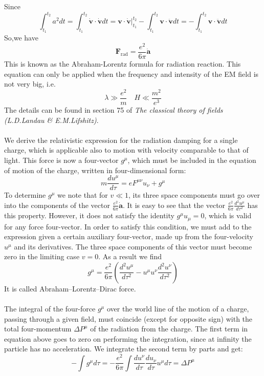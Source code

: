 Since
\[\int_{t_{1}}^{t_{2}}a^{2}dt = \int_{t_{1}}^{t_{2}}\dot{\bm{v}}\cdot\dot{\bm{v}}dt = \bm{v}\cdot\dot{\bm{v}}|_{t_{1}}^{t_{2}}-\int_{t_{1}}^{t_{2}}\bm{v} \cdot\ddot{\bm{v}}dt = -\int_{t_{1}}^{t_{2}}\bm{v} \cdot\ddot{\bm{v}}dt\]
So,we have
\[\bm{F}_{\mathrm{rad}} = \frac{e^2}{6\pi} \dot{\bm{a}}\]
This is known as the Abraham-Lorentz formula for radiation reaction. This equation can only be applied when the frequency and intensity of the EM field is not very big, i.e.
\[\lambda \gg \frac{e^2}{m} \quad H \ll \frac{m^2}{e^3}\]
The details can be found in section 75 of \emph{The classical theory of fields (L.D.Landau \& E.M.Lifshitz)}.
\\ \\
We derive the relativistic expression for the radiation damping for a single charge, which is applicable also to motion with velocity comparable to that of light. This force is now a four-vector $g^{\mu}$, which must be included in the equation of motion of the charge, written in four-dimensional form:
\[m\frac{du^{\mu}}{d\tau} = eF^{\mu\nu}u_{\nu} + g^{\mu}\]
To determine $g^{\mu}$ we note that for $v \ll 1$, its three space components must go over into the components of the vector $\frac{e^2}{6\pi}\dot{\bm{a}}$. It is easy to see that the vector $\frac{e^2}{6\pi} \frac{d^2u^{\mu}}{d\tau^2}$ has this property. However, it does not satisfy the identity $g^{\mu}u_{\mu} = 0$, which is valid for any force four-vector. 
In order to satisfy this condition, we must add to the expression given a certain auxiliary four-vector, made up from the four-velocity $u^{\mu}$ and its derivatives. 
The three space components of this vector must become zero in the limiting case $v = 0$. As a result we find
\[g^{\mu} = \frac{e^2}{6\pi} \left( \frac{d^2u^{\mu}}{d\tau^2} -u^{\mu}u^{\nu}\frac{d^2u^{\nu}}{d\tau^2} \right)\]
It is called Abraham–Lorentz–Dirac force.
\\ \\
The integral of the four-force $g^{\mu}$ over the world line of the motion of a charge, passing through a given field, must coincide (except for opposite sign) with the total four-momentum $\Delta P^{\mu}$ of the radiation from the charge. 
The first term in equation above goes to zero on performing the integration, since at infinity the particle has no acceleration. We integrate the second term by parts and get:
\[-\int g^{\mu} d\tau = -\frac{e^2}{6\pi} \int \frac{du^{\nu}}{d\tau} \frac{du_{\nu}}{d\tau} u^{\mu}d\tau = \Delta P^{\mu}\]

